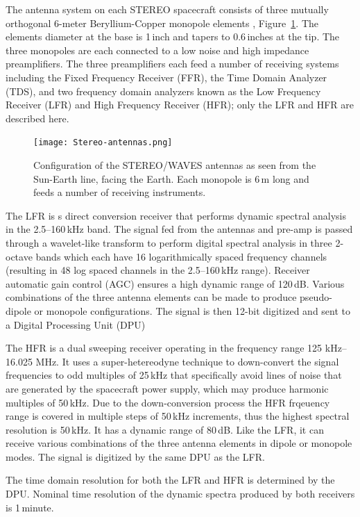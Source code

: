 The antenna system on each STEREO spacecraft consists of three mutually orthogonal 6-meter Beryllium-Copper monopole elements \citep{bale2008}, Figure~\ref{fig:swaves_antennas}. The elements diameter at the base is 1\,inch and tapers to 0.6\,inches at the tip. The three monopoles are each connected to a low noise and high impedance preamplifiers. The three preamplifiers each feed a number of receiving systems including the Fixed Frequency Receiver (FFR), the Time Domain Analyzer (TDS), and two frequency domain analyzers known as the Low Frequency Receiver (LFR) and High Frequency Receiver (HFR); only the LFR and HFR are described here.
\begin{figure}[!t]
\begin{center}
\texttt{[image: Stereo-antennas.png]}
\caption[The SWAVES antennas]{Configuration of the STEREO/WAVES antennas as seen from the Sun-Earth line, facing the Earth. Each monopole is 6\,m long and feeds a number of receiving instruments.}
\label{fig:swaves_antennas}
\end{center}
\end{figure}

The LFR is s direct conversion receiver that performs dynamic spectral analysis in the 2.5--160\,kHz band. The signal fed from the antennas and pre-amp is passed through a wavelet-like transform to perform digital spectral analysis in three 2-octave bands which each have 16 logarithmically spaced frequency channels (resulting in 48 log spaced channels in the 2.5--160\,kHz range). Receiver automatic gain control (AGC) ensures a high dynamic range of 120\,dB. Various combinations of the three antenna elements can be made to produce pseudo-dipole or monopole configurations. The signal is then 12-bit digitized and sent to a Digital Processing Unit (DPU)

The HFR is a dual sweeping receiver operating in the frequency range 125 kHz--16.025 MHz. It uses a super-hetereodyne technique to down-convert the signal frequencies to odd multiples of 25\,kHz that specifically avoid lines of noise that are generated by the spacecraft power supply, which may produce harmonic multiples of 50\,kHz. Due to the down-conversion process the HFR frqeuency range is covered in multiple steps of 50\,kHz increments, thus the highest spectral resolution is 50\,kHz. It has a dynamic range of 80\,dB. Like the LFR, it can receive various combinations of the three antenna elements in dipole or monopole modes. The signal is digitized by the same DPU as the LFR.

The time domain resolution for both the LFR and HFR is determined by the DPU. Nominal time resolution of the dynamic spectra produced by both receivers is 1\,minute.

